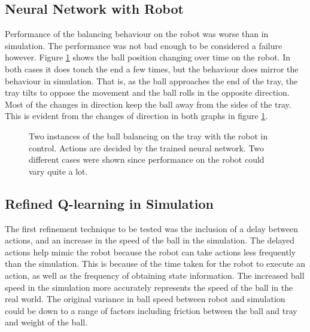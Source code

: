 \documentclass[12pt,a4paper]{article}
\begin{document}
\subsection{Neural Network with Robot}
Performance of the balancing behaviour on the robot was worse than in simulation. The performance was not bad enough to be considered a failure however. Figure \ref{nn_nao} shows the ball position changing over time on the robot. In both cases it does touch the end a few times, but the behaviour does mirror the behaviour in simulation. That is, as the ball approaches the end of the tray, the tray tilts to oppose the movement and the ball rolls in the opposite direction. Most of the changes in direction keep the ball away from the sides of the tray. This is evident from the changes of direction in both graphs in figure \ref{nn_nao}.
\begin{figure}[H]
	\centering
	\caption{Two instances of the ball balancing on the tray with the robot in control. Actions are decided by the trained neural network. Two different cases were shown since performance on the robot could vary quite a lot.}
	\label{nn_nao}
\end{figure}
\subsection{Refined Q-learning in Simulation}
The first refinement technique to be tested was the inclusion of a delay between actions, and an increase in the speed of the ball in the simulation. The delayed actions help mimic the robot because the robot can take actions less frequently than the simulation. This is because of the time taken for the robot to execute an action, as well as the frequency of obtaining state information. The increased ball speed in the simulation more accurately represents the speed of the ball in the real world. The original variance in ball speed between robot and simulation could be down to a range of factors including friction between the ball and tray and weight of the ball.
\end{document}

